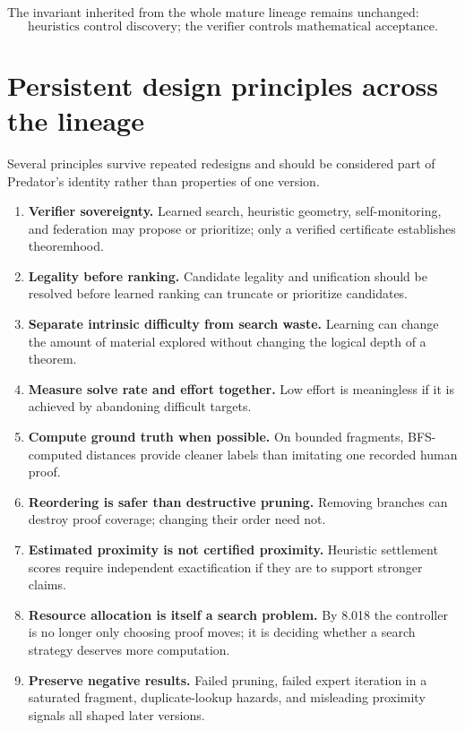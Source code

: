 \documentclass[11pt]{article}
\begin{document}
The invariant inherited from the whole mature lineage remains unchanged:
\[
\boxed{\text{heuristics control discovery; the verifier controls mathematical acceptance}.}
\]

\section{Persistent design principles across the lineage}

Several principles survive repeated redesigns and should be considered part of Predator's identity rather than properties of one version.

\begin{enumerate}
\item \textbf{Verifier sovereignty.} Learned search, heuristic geometry, self-monitoring, and federation may propose or prioritize; only a verified certificate establishes theoremhood.
\item \textbf{Legality before ranking.} Candidate legality and unification should be resolved before learned ranking can truncate or prioritize candidates.
\item \textbf{Separate intrinsic difficulty from search waste.} Learning can change the amount of material explored without changing the logical depth of a theorem.
\item \textbf{Measure solve rate and effort together.} Low effort is meaningless if it is achieved by abandoning difficult targets.
\item \textbf{Compute ground truth when possible.} On bounded fragments, BFS-computed distances provide cleaner labels than imitating one recorded human proof.
\item \textbf{Reordering is safer than destructive pruning.} Removing branches can destroy proof coverage; changing their order need not.
\item \textbf{Estimated proximity is not certified proximity.} Heuristic settlement scores require independent exactification if they are to support stronger claims.
\item \textbf{Resource allocation is itself a search problem.} By 8.018 the controller is no longer only choosing proof moves; it is deciding whether a search strategy deserves more computation.
\item \textbf{Preserve negative results.} Failed pruning, failed expert iteration in a saturated fragment, duplicate-lookup hazards, and misleading proximity signals all shaped later versions.
\end{enumerate}
\end{document}
